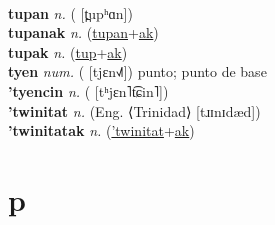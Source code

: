  \label{tupel} \\
\textbf{tupan} \textit{n.} ( [t̪upʰɑn])
 \label{tupan} \\
\textbf{tupanak} \textit{n.} (\hyperref[tupan]{tupan}+\hyperref[ak]{ak})
 \label{tupanak} \\
\textbf{tupak} \textit{n.} (\hyperref[tup]{tup}+\hyperref[ak]{ak})
 \label{tupak} \\
\textbf{tyen} \textit{num.} ( [tjɛn˧˩˥])
punto; punto de base \label{tyen} \\
\textbf{'tyencin} \textit{n.} ( [tʰjɛn˥t͡ɕin˥])
 \label{'tyencin} \\
\textbf{'twinitat} \textit{n.} (Eng. ⟨Trinidad⟩ [tɹɪnɪdæd])
 \label{'twinitat} \\
\textbf{'twinitatak} \textit{n.} (\hyperref['twinitat]{'twinitat}+\hyperref[ak]{ak})
 \label{'twinitatak} 

\section{p}

